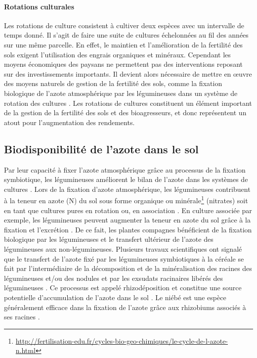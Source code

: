 \documentclass[a4paper,11pt]{article}
\begin{document}
\paragraph{Rotations culturales} Les rotations de culture consistent à
cultiver deux espèces avec un intervalle de temps donné. Il s'agit de
faire une suite de cultures échelonnées au fil des années sur une même
parcelle. En effet, le maintien et l'amélioration de la fertilité des
sols exigent l'utilisation des engrais organiques et
minéraux. Cependant les moyens économiques des paysans ne permettent
pas des interventions reposant sur des investissements importants. Il
devient alors nécessaire de mettre en œuvre des moyens naturels de
gestion de la fertilité des sols, comme la fixation biologique de
l'azote atmosphérique par les légumineuses dans un système de rotation
des cultures \cite{TRAORE_2009}. Les rotations de cultures constituent
un élément important de la gestion de la fertilité des sols et des
bioagresseurs, et donc représentent un atout pour l'augmentation des
rendements.


\subsection{Biodisponibilité de l'azote dans le sol}

Par leur capacité à fixer l'azote atmosphérique grâce au processus de
la fixation symbiotique, les légumineuses améliorent le bilan de
l'azote dans les systèmes de cultures
\cite{Ndakidemi_2005,Fustec11}. Lors de la fixation d'azote
atmosphérique, les légumineuses contribuent à la teneur en azote (N)
du sol sous forme organique ou
minérale\footnote{\url{http://fertilisation-edu.fr/cycles-bio-geo-chimiques/le-cycle-de-l-azote-n.html}}
(nitrates) soit en tant que cultures pures en rotation ou, en
association \cite{Bado_2006,Chu_2004,Makoi_2009,Ndakidemi_2005}. En
culture associée par exemple, les légumineuses peuvent augmenter la
teneur en azote du sol grâce à la fixation et l'excrétion
\cite{Trenbath_1976,Fustec11}. De ce fait, les plantes compagnes
bénéficient de la fixation biologique par les légumineuses et le
transfert ultérieur de l'azote des légumineuses aux
non-légumineuses. Plusieurs travaux scientifiques ont signalé que le
transfert de l'azote fixé par les légumineuses symbiotiques à la
céréale se fait par l'intermédiaire de la décomposition et de la
minéralisation des racines des légumineuses et/ou des nodules
\cite{Burity_1989} et par les exsudats racinaires libérés des
légumineuses \cite{Ndakidemi_2005,Makoi_2009}. Ce processus est appelé
rhizodéposition\cite{Fustec11} et constitue une source potentielle
d'accumulation de l'azote dans le sol \cite{Koulibi_FideleZONGO}. Le
niébé est une espèce généralement efficace dans la fixation de l'azote
grâce aux rhizobiums associés à ses racines \cite{TRAORE_2009}.

\newpage



\end{document}
